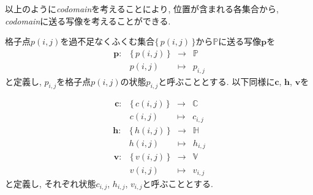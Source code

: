 以上のように\textit{codomain}を考えることにより, 位置が含まれる各集合から, \textit{codomain}に送る写像を考えることができる.
\begin{definition}[写像$\bm{p}$, $\bm{c}$, $\bm{h}$, $\bm{v}$]\label{definition:Mapping}
  格子点$p(i,j)$を過不足なくふくむ集合$\{\,p(i,j)\,\}$から$\mathbb{P}$に送る写像$\bm{p}$を
  \begin{equation}
    \begin{array}{rccc}
      \bm{p}\colon & \{\,p(i,j)\,\} & \longrightarrow & \mathbb{P} \\
                   & p(i,j)         & \longmapsto     & p_{i,j}
    \end{array}
  \end{equation}
  と定義し, $p_{i,j}$を格子点$p(i,j)$の状態$p_{i,j}$と呼ぶこととする.
  以下同様に$\bm{c}$, $\bm{h}$, $\bm{v}$を

  \begin{equation}
    \begin{array}{rccc}
      \bm{c}\colon & \{\,c(i,j)\,\} & \longrightarrow & \mathbb{C} \\
                   & c(i,j)         & \longmapsto     & c_{i,j}
    \end{array}
  \end{equation}
  \begin{equation}
    \begin{array}{rccc}
      \bm{h}\colon & \{\,h(i,j)\,\} & \longrightarrow & \mathbb{H} \\
                   & h(i,j)         & \longmapsto     & h_{i,j}
    \end{array}
  \end{equation}
  \begin{equation}
    \begin{array}{rccc}
      \bm{v}\colon & \{\,v(i,j)\,\} & \longrightarrow & \mathbb{V} \\
                   & v(i,j)         & \longmapsto     & v_{i,j}
    \end{array}
  \end{equation}
  と定義し, それぞれ状態$c_{i,j}$, $h_{i,j}$, $v_{i,j}$と呼ぶこととする.


\end{definition}
